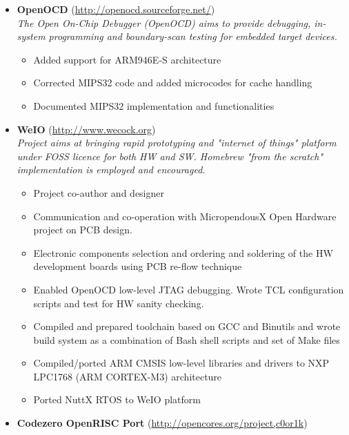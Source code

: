 \documentclass[a4paper, oneside, final]{scrartcl}
\begin{document}
\begin{itemize}
   \item \textbf{OpenOCD} (\url{http://openocd.sourceforge.net/}) \\
      \textit{The Open On-Chip Debugger (OpenOCD) aims to provide debugging,
         in-system programming and boundary-scan testing for embedded target
            devices.}
      \begin{itemize}
         \item Added support for ARM946E-S architecture
         \item Corrected MIPS32 code and added microcodes for cache handling
         \item Documented MIPS32 implementation and functionalities
      \end{itemize}
   \item \textbf{WeIO} (\url{http://www.wecock.org}) \\
      \textit{Project aims at bringing rapid prototyping and "internet of things"
         platform under FOSS licence for both HW and SW. Homebrew "from the scratch"
         implementation is employed and encouraged.}
      \begin{itemize}
         \item Project co-author and designer
         \item Communication and co-operation with MicropendousX Open Hardware
               project on PCB design.
         \item Electronic components selection and ordering and soldering of
               the HW development boards using PCB re-flow technique
         \item Enabled OpenOCD low-level JTAG debugging. Wrote TCL
               configuration scripts and test for HW sanity checking.
         \item Compiled and prepared toolchain based on GCC and Binutils and
               wrote build system as a combination of Bash shell scripts and set of Make files
         \item Compiled/ported ARM CMSIS low-level libraries and drivers to NXP
                  LPC1768 (ARM CORTEX-M3) architecture
         \item Ported NuttX RTOS to WeIO platform
      \end{itemize}
   \item \textbf{Codezero OpenRISC Port} (\url{http://opencores.org/project,c0or1k}) \\

\end{itemize}
\end{document}
